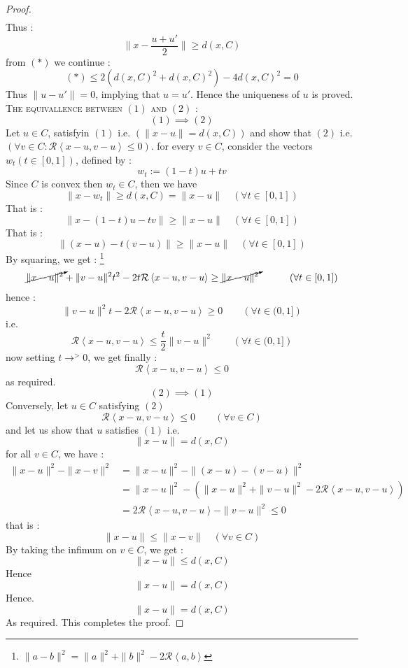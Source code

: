 \begin{proof}
\begin{align*}
\end{align*}
Thus : 
\[
\| x- \frac{u + u'}{2} \|  
\geq d(x,C) 
\]
from $(*)$ we continue : 
\[
 (*) \leq  
 2 \left( 
   d(x,C) ^2  + 
   d(x,C) ^2 
 \right)- 4 
 d(x,C) ^2  = 0
\]
Thus $\| u-u' \| = 0$, implying that 
$u = u' $. Hence the uniqueness of $u $ is proved. 
\\
\textsc{The equivallence between $(1)  $ and $(2)  $ :}
\\
\[
  (1)  \implies (2) 
\]
Let $u \in  C $, satisfyin $(1)$ i.e. $(\| x-u \| = d(x,C) )  $ and 
show that $(2)$ i.e. $(\forall v \in  C : 
\mathcal{R} \left\langle x-u, v-u \right\rangle \leq 0)$. for every 
$v \in  C $, consider the vectors $w_{t} (t \in  [0,1])  $, defined by : 
\[
w_{t} := 
(1-t) u + t v
\]
Since $C $ is convex then $w_{t} \in C $, then we have 
\[
  \| x-w_{t} \|  \geq  d(x, C) = \| x-u \|  \quad 
  \left( \forall  t \in  [0,1] \right)
\]
That is : 
\[
\| x - (1-t)u - tv  \|  
\geq \| x-u \|  \quad \left( \forall  t \in [0,1] \right)
\]
That is : 
\[
\|(x-u) - t(v-u)  \|  \geq 
\| x-u \|  \quad \left( 
  \forall t \in  [0,1]
\right)
\]
By squaring, we get : \footnote{
  $\| a-b \| ^2  = \| a \| ^2  + \| b \| ^2  - 
  2 \mathcal{R} \left\langle a,b \right\rangle $ 
}
\begin{align*}
\cancelto{}{
\| x-u \| ^2 
} 
+ 
\| v-u \| ^2 t ^2 
- 2 t \mathcal{R} 
\left\langle x -u, v -u \right\rangle  
\geq 
\cancelto{}{
\| x-u \| ^2 
}  \quad \quad \quad 
\left( \forall t \in  [0,1] \right)
\end{align*}
hence : 
\[
\| v-u \| ^2  t - 2 \mathcal{R} 
\left\langle 
  x-u, v-u
\right\rangle  \geq 0 \quad 
\quad \left( 
  \forall  t \in  (0,1]
\right)
\]
i.e. 
\[
\mathcal{R} \left\langle 
  x-u, v-u
\right\rangle  \leq 
\frac{t}{2}
\| v-u \| ^2  \quad \quad 
\left( 
  \forall t \in (0,1]
\right)
\]
now setting $t \rightarrow^{>} 0 $, we get finally : 
\[
\mathcal{R} \left\langle 
  x-u, v-u
\right\rangle  \leq 0
\]
as required. 
\[
(2)  \implies (1)   
\]
Conversely, let $u \in  C $ satisfying $(2)$ 
\[
  \mathcal{R} \left\langle x-u, v-u \right\rangle  \leq 0 \quad 
  \quad \left( \forall v \in  C \right)
\]
and let us show that $u $ satisfies $(1)$ i.e. 
\[
\| x-u \|  = d(x,C)  
\]
for all $v \in  C $, we have : 
\begin{align*}
\| x-u \| ^2  - 
\| x-v \| ^2  &= 
\| x-u \| ^2  - 
\| (x-u)  -(v-u)  \| ^2  
\\
&= 
\| x-u \| ^2  - 
\left( 
  \| x-u \| ^2  
  + \| v-u \| ^2  
  - 2 \mathcal{R} 
  \left\langle x-u, v-u \right\rangle 
\right) 
\\
&=
2 \mathcal{R} 
\left\langle 
  x-u, v-u
\right\rangle  - 
\| v-u \| ^2 
\leq  0
\end{align*} 
that is : 
\[
\| x-u \| \leq 
\| x-v \|  \quad 
\left( 
  \forall  v \in  C
\right)
\]
By taking the infimum on $v \in C $, we get :
\[
\| x-u \|  
\leq d(x,C) 
\]
Hence 
\[
\| x-u \| = d(x,C) 
\] 
Hence. 
\[
\| x-u \| = d(x,C) 
\]
As required. This completes the proof.
\end{proof}

